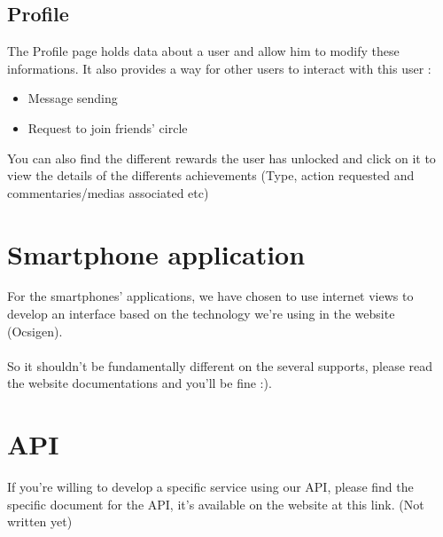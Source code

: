 \documentclass{life-en}
\begin{document}
\subsection{Profile}

The Profile page holds data about a user and allow him to modify these informations. It also provides a way for other users to interact with this user :
\begin{itemize}
\item Message sending
\item Request to join friends' circle
\end{itemize}

You can also find the different rewards the user has unlocked and click on it to view the details of the differents achievements (Type, action requested and commentaries/medias associated etc)
\\
\section{Smartphone application}

For the smartphones' applications, we have chosen to use internet views to develop an interface based on the technology we're using in the website (Ocsigen).\\
\\

So it shouldn't be fundamentally different on the several supports, please read the website documentations and you'll be fine :).

\section{API}

If you're willing to develop a specific service using our API, please find the specific document for the API, it's available on the website at this link. (Not written yet)
\end{document}
